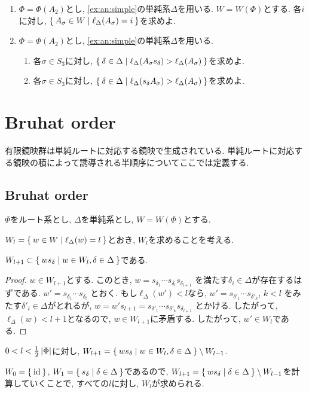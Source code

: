 \begin{enumerate}
\item 
$\Phi=\Phi(A_{2})$とし,
\cref{ex:an:simple}の単純系$\Delta$を用いる.
$W=W(\Phi)$とする.
  各$i$に対し, $\Set{A_\sigma\in W|\ell_\Delta(A_\sigma)=i}$を求めよ.
\item 
$\Phi=\Phi(A_{2})$とし,
\cref{ex:an:simple}の単純系$\Delta$を用いる.
\begin{enumerate}
\item 各$\sigma\in S_3$に対し,
  $\Set{\delta\in \Delta|\ell_\Delta(A_\sigma s_\delta)>\ell_\Delta(A_\sigma)}$を求めよ.
\item 各$\sigma\in S_3$に対し,
  $\Set{\delta\in \Delta|\ell_\Delta(s_\delta A_\sigma)>\ell_\Delta(A_\sigma)}$を求めよ.
\end{enumerate}

\end{enumerate}


\chapter{Bruhat order}

有限鏡映群は単純ルートに対応する鏡映で生成されている.
単純ルートに対応する鏡映の積によって誘導される半順序についてここでは定義する.

\section{Bruhat order}
$\Phi$をルート系とし, $\Delta$を単純系とし,
$W=W(\Phi)$とする.

$W_l=\Set{w\in W|\ell_\Delta(w)=l}$とおき,
$W_l$を求めることを考える.
\begin{lemma}
  $W_{l+1}\subset \Set{ws_\delta|w\in W_l,\delta\in\Delta}$である.
\end{lemma}
\begin{proof}
  $w\in W_{l+1}$とする.
  このとき,
  $w=s_{\delta_1}\cdots s_{\delta_l}s_{\delta_{l+1}}$
  を満たす$\delta_i\in\Delta$が存在するはずである.
  $w'=s_{\delta_1}\cdots s_{\delta_l}$
  とおく.
  もし$\ell_\Delta(w')<l$なら,
  $w'=s_{\delta'_1}\cdots s_{\delta'_{k}}$, $k<l$
  をみたす$\delta'_i\in\Delta$がとれるが,
  $w=w's_{l+1}=s_{\delta'_1}\cdots s_{\delta'_{k}}s_{\delta_{l+1}}$
  とかける. したがって, $\ell_\Delta(w)<l+1$となるので,
  $w\in W_{l+1}$に矛盾する.
  したがって, $w'\in W_{l}$である.
\end{proof}
\begin{cor}
  $0<l< \frac{1}{2}\left|\Phi\right|$に対し,
  $W_{l+1}=\Set{ws_\delta|w\in W_l,\delta\in\Delta}\setminus W_{l-1}$.
\end{cor}
$W_{0}=\Set{\operatorname{id}}$, $W_{1}=\Set{s_\delta|\delta\in\Delta}$であるので,
$W_{l+1}=\Set{ws_\delta|\delta\in\Delta}\setminus W_{l-1}$を計算していくことで,
すべての$l$に対し, $W_{l}$が求められる.

